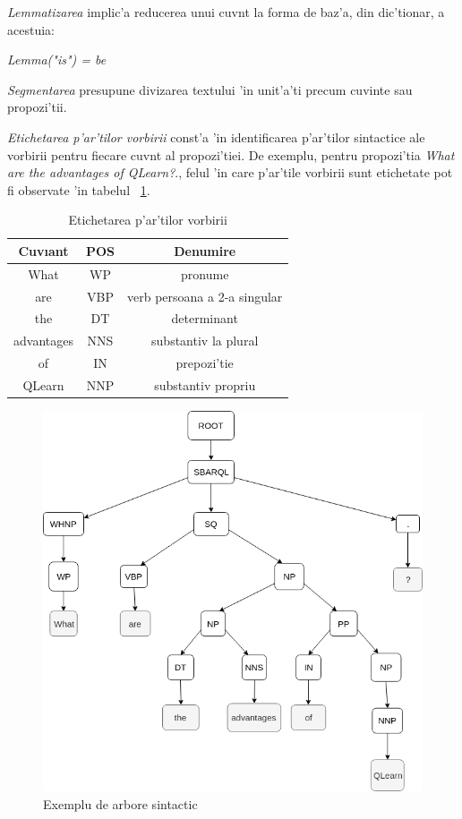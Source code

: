 \documentclass[12pt,a4paper,twoside]{report}
\begin{document}
{\it Lemmatizarea} implic'a reducerea unui cuv\ia nt la forma de baz'a, din dic'tionar, a acestuia: 

\begin{center}
{\it Lemma("is") = be}
\end{center}

{\it Segmentarea} presupune divizarea textului 'in unit'a'ti precum cuvinte sau propozi'tii. 

{\it Etichetarea p'ar'tilor vorbirii} const'a 'in identificarea p'ar'tilor sintactice ale vorbirii pentru fiecare cuv\ia nt al propozi'tiei. De exemplu, pentru propozi'tia {\it What are the advantages of QLearn?}., felul 'in care p'ar'tile vorbirii sunt etichetate pot fi observate 'in tabelul ~\ref{table:pos_Tag}.


\begin{table}
\caption{Etichetarea p'ar'tilor vorbirii}
\centering                          %
\begin{tabular}{|c|c|c|}          %
\hline\hline                        %
Cuv\i ant& POS & Denumire\\ [0.5ex]   %
\hline                              %
What & WP & pronume\\[1ex]    
are & VBP & verb persoana a 2-a singular\\[1ex]%
the & DT & determinant\\[1ex]
advantages & NNS & substantiv la plural\\[1ex]
of & IN & prepozi'tie\\[1ex]
QLearn & NNP & substantiv propriu \\[1ex]
\hline                              
\end{tabular}
\label{table:pos_Tag} 
\end{table}


\begin{figure}
    \centering
    \includegraphics[width = 0.5\linewidth]{img/alice_parse.png}
        \caption{Exemplu de arbore sintactic}
    \label{fig:alice_parse}
\end{figure}
\end{document}
